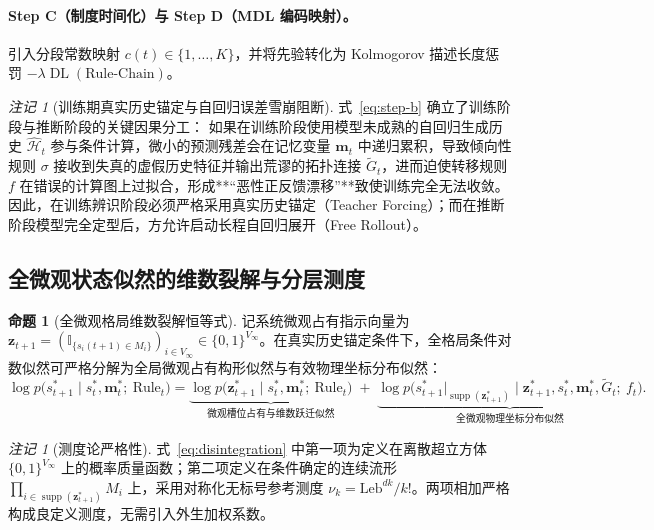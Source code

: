 \documentclass[11pt,a4paper]{article}
\numberwithin{equation}{section}
\theoremstyle{definition}
\newtheorem{proposition}[definition]{命题}
\theoremstyle{remark}
\newtheorem{remark}[definition]{注记}
\DeclareMathOperator{\supp}{\mathrm{supp}} %
\DeclareMathOperator{\DL}{\mathrm{DL}}     %
\begin{document}
	\paragraph{Step C（制度时间化）与 Step D（MDL 编码映射）。}
	引入分段常数映射 $c(t)\in\{1,\dots,K\}$，并将先验转化为 Kolmogorov 描述长度惩罚 $-\lambda\DL(\text{Rule-Chain})$。

	\begin{remark}[训练期真实历史锚定与自回归误差雪崩阻断]\label{rem:teacher-forcing-physics}
		式~\eqref{eq:step-b} 确立了训练阶段与推断阶段的关键因果分工：
		如果在训练阶段使用模型未成熟的自回归生成历史 $\widehat{\mathcal{H}}_t$ 参与条件计算，微小的预测残差会在记忆变量 $\mathbf{m}_t$ 中递归累积，导致倾向性规则 $\sigma$ 接收到失真的虚假历史特征并输出荒谬的拓扑连接 $\widetilde{G}_t$，进而迫使转移规则 $f$ 在错误的计算图上过拟合，形成**“恶性正反馈漂移”**致使训练完全无法收敛。因此，在训练辨识阶段必须严格采用真实历史锚定（Teacher Forcing）；而在推断阶段模型完全定型后，方允许启动长程自回归展开（Free Rollout）。
	\end{remark}
	
	\subsection{全微观状态似然的维数裂解与分层测度}
	
	\begin{proposition}[全微观格局维数裂解恒等式]\label{prop:disintegration}
		记系统微观占有指示向量为 $\mathbf{z}_{t+1} = (\mathbb{I}_{\{s_i(t+1)\in M_i\}})_{i\in V_\infty} \in \{0,1\}^{V_\infty}$。在真实历史锚定条件下，全格局条件对数似然可严格分解为全局微观占有构形似然与有效物理坐标分布似然：
		\begin{equation}
			\log p\bigl(s_{t+1}^\ast\mid s_t^\ast, \mathbf{m}_t^\ast;\ \text{Rule}_t\bigr) =
			\underset{\text{微观槽位占有与维数跃迁似然}}{\underbrace{\log p\bigl(\mathbf{z}_{t+1}^\ast\mid s_t^\ast, \mathbf{m}_t^\ast;\ \text{Rule}_t\bigr)}}
			\;+\;
			\underset{\text{全微观物理坐标分布似然}}{\underbrace{\log p\bigl(s_{t+1}^\ast|_{\supp(\mathbf{z}_{t+1}^\ast)}\mid \mathbf{z}_{t+1}^\ast, s_t^\ast, \mathbf{m}_t^\ast, \widetilde{G}_t;\ f_t\bigr)}}.
			\label{eq:disintegration}
		\end{equation}
	\end{proposition}
	
	\begin{remark}[测度论严格性]\label{rem:measure-rigor}
		式~\eqref{eq:disintegration} 中第一项为定义在离散超立方体 $\{0,1\}^{V_\infty}$ 上的概率质量函数；第二项定义在条件确定的连续流形 $\prod_{i\in\supp(\mathbf{z}_{t+1}^\ast)} M_i$ 上，采用对称化无标号参考测度 $\nu_k = \mathrm{Leb}^{dk}/k!$。两项相加严格构成良定义测度，无需引入外生加权系数。
	\end{remark}
	
\end{document}
